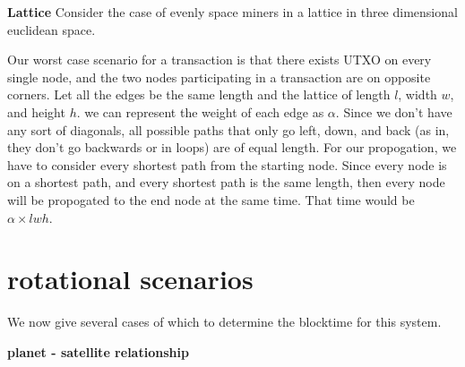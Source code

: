 \documentclass[conference]{IEEEtran}
\begin{document}
\textbf{Lattice} Consider the case of evenly space miners in a lattice in three dimensional euclidean space. 
\begin{center}
\end{center}
Our worst case scenario for a transaction is that there exists UTXO on every single node, and the two nodes participating in a transaction are on opposite corners. Let all the edges be the same length and the lattice of length $l$, width $w$, and height $h$. we can represent the weight of each edge as $\alpha$. Since we don't have any sort of diagonals, all possible paths that only go left, down, and back (as in, they don't go backwards or in loops) are of equal length. For our propogation, we have to consider every shortest path from the starting node. Since every node is on a shortest path, and every shortest path is the same length, then every node will be propogated to the end node at the same time. That time would be $\alpha \times lwh$.

\section{rotational scenarios}
We now give several cases of which to determine the blocktime for this system. \cite{template}

\textbf{planet - satellite relationship}

\begin{center}
\end{center}
\end{document}
